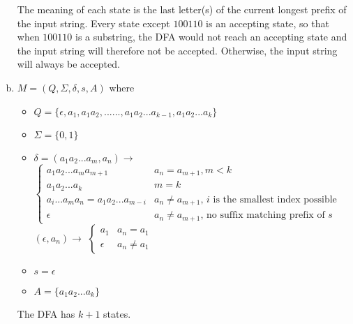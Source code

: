 \documentclass[11pt]{article}
\begin{document}
\begin{solution}
\begin{enumerate}[(a)]
\begin{center}
\end{center}
The meaning of each state is the last letter(s) of the current longest prefix of the input string. Every state except $100110$ is an accepting state, so that when $100110$ is a substring, the DFA would not reach an accepting state and the input string will therefore not be accepted. Otherwise, the input string will always be accepted.

\item $M=(Q,\Sigma,\delta,s,A)$ where
\begin{itemize}
\item $Q=\{\epsilon, a_{1}, a_{1}a_{2}, ......, a_{1}a_{2}...a_{k-1}, a_{1}a_{2}...a_{k}\}$
\item $\Sigma=\{ 0,1 \}$
\item $\delta=(a_{1}a_{2}...a_{m}, a_{n})\to$
\begin{math}
  \left\{
    \begin{array}{ll}
      	a_{1}a_{2}...a_{m}a_{m+1} &\text{$a_{n}=a_{m+1},m<k$}\\
      	a_{1}a_{2}...a_{k} &\text{$m=k$}\\
		a_{i}...a_{m}a_{n}=a_{1}a_{2}...a_{m-i} &\text{$a_{n}\neq a_{m+1}$, $i$ is the smallest index possible}\\
		\epsilon &\text{$a_{n}\neq a_{m+1}$, no suffix matching prefix of $s$}
    \end{array}
  \right.
\end{math}\\
$(\epsilon, a_{n})\to$
\begin{math}
  \left\{
    \begin{array}{ll}
      	a_{1} &\text{$a_{n}=a_{1}$}\\
		\epsilon &\text{$a_{n}\neq a_{1}$}
    \end{array}
  \right.
\end{math}\\
\item $s=\epsilon$
\item $A=\{ a_{1}a_{2}...a_{k} \}$
\end{itemize}
The DFA has $k+1$ states.


\end{enumerate}
\end{solution}
\end{document}
